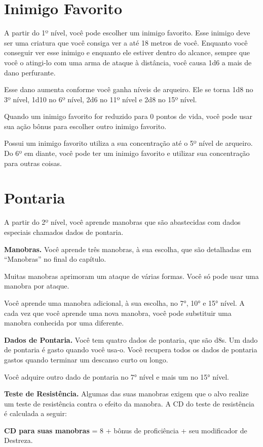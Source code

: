 \documentclass{RPG_Adventure}[2021/10/20]
\begin{document}
\begin{multicols}{2}
\section*{Inimigo Favorito}%

A partir do 1º nível, você pode escolher um inimigo favorito. Esse inimigo deve
ser uma criatura que você consiga ver a até 18 metros de você. Enquanto você
conseguir ver esse inimigo e enquanto ele estiver dentro do alcance, sempre que
você o atingi-lo com uma arma de ataque à distância, você causa 1d6 a mais de
dano perfurante.

Esse dano aumenta conforme você ganha níveis de arqueiro. Ele se torna 1d8 no
3º nível, 1d10 no 6º nível, 2d6 no 11º nível e 2d8 no 15º nível.

Quando um inimigo favorito for reduzido para 0 pontos de vida, você pode usar
sua ação bônus para escolher outro inimigo favorito.

Possui um inimigo favorito utiliza a sua concentração até o 5º nível de
arqueiro. Do 6º em diante, você pode ter um inimigo favorito e utilizar sua
concentração para outras coisas.

\section*{Pontaria}%

A partir do 2º nível, você aprende manobras que são abastecidas com dados
especiais chamados dados de pontaria.

\textbf{Manobras.} Você aprende três manobras, à sua escolha, que são detalhadas
em ``Manobras'' no final do capítulo.

Muitas manobras aprimoram um ataque de várias formas.  Você só pode usar uma
manobra por ataque.

Você aprende uma manobra adicional, à sua escolha, no 7°, 10° e 15° nível. A
cada vez que você aprende uma nova manobra, você pode substituir uma manobra
conhecida por uma diferente.

\textbf{Dados de Pontaria.} Você tem quatro dados de pontaria, que são d8s. Um
dado de pontaria é gasto quando você usa-o. Você recupera todos os dados de
pontaria gastos quando terminar um descanso curto ou longo.

Você adquire outro dado de pontaria no 7° nível e mais um no 15° nível.

\textbf{Teste de Resistência.} Algumas das suas manobras exigem que o alvo
realize um teste de resistência contra o efeito da manobra. A CD do teste de
resistência é calculada a seguir:
\begin{center}
\textbf{CD para suas manobras} = 8 + bônus de proficiência + seu modificador de
Destreza.
\end{center}


\end{multicols}
\end{document}
